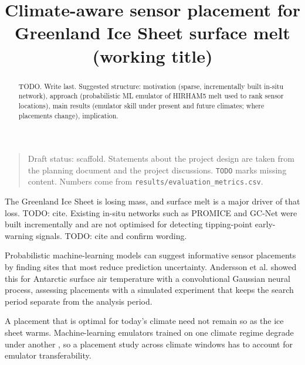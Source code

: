 \documentclass[tc, manuscript]{copernicus}
\begin{document}
\title{Climate-aware sensor placement for Greenland Ice Sheet surface
melt (working title)}




\received{}
\pubdiscuss{}
\revised{}
\accepted{}
\published{}


\maketitle

\begin{abstract}
TODO. Write last. Suggested structure: motivation (sparse, incrementally
built in-situ network), approach (probabilistic ML emulator of HIRHAM5
melt used to rank sensor locations), main results (emulator skill under
present and future climates; where placements change), implication.
\end{abstract}

\begin{quote}
Draft status: scaffold. Statements about the project design are taken
from the planning document and the project discussions. \texttt{TODO}
marks missing content. Numbers come from
\texttt{results/evaluation\_metrics.csv}.
\end{quote}

\introduction

The Greenland Ice Sheet is losing mass, and surface melt is a major
driver of that loss. TODO: cite. Existing in-situ networks such as
PROMICE and GC-Net were built incrementally and are not optimised for
detecting tipping-point early-warning signals. TODO: cite and confirm
wording.

Probabilistic machine-learning models can suggest informative sensor
placements by finding sites that most reduce prediction uncertainty.
Andersson et al. \citeyearpar{andersson2023} showed this for Antarctic
surface air temperature with a convolutional Gaussian neural process,
assessing placements with a simulated experiment that keeps the search
period separate from the analysis period.

A placement that is optimal for today's climate need not remain so as
the ice sheet warms. Machine-learning emulators trained on one climate
regime degrade under another \citep{schlager_preprint}, so a placement
study across climate windows has to account for emulator
transferability.
\end{document}
